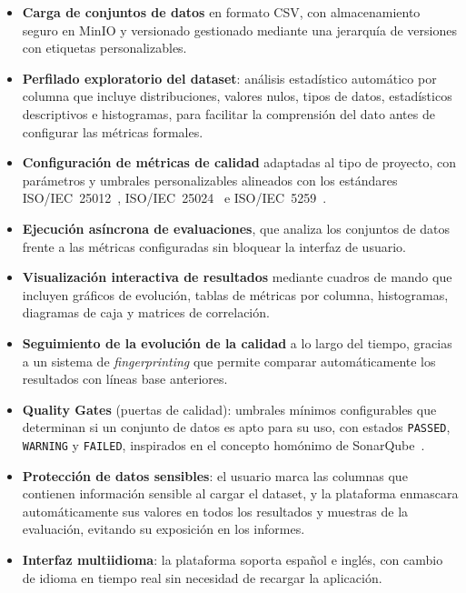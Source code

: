 \begin{itemize}
  \item \textbf{Carga de conjuntos de datos} en formato \ac{CSV}, con
    almacenamiento seguro en MinIO y versionado gestionado mediante
    una jerarquía de versiones con etiquetas personalizables.

  \item \textbf{Perfilado exploratorio del dataset}: análisis estadístico
    automático por columna que incluye distribuciones, valores nulos,
    tipos de datos, estadísticos descriptivos e histogramas, para facilitar
    la comprensión del dato antes de configurar las métricas formales.

  \item \textbf{Configuración de métricas de calidad} adaptadas al tipo de
    proyecto, con parámetros y umbrales personalizables alineados con los
    estándares \ac{ISO}/\ac{IEC}~25012~\citep{iso25012},
    \ac{ISO}/\ac{IEC}~25024~\citep{iso25024} e
    \ac{ISO}/\ac{IEC}~5259~\citep{iso5259}.

  \item \textbf{Ejecución asíncrona de evaluaciones}, que analiza los
    conjuntos de datos frente a las métricas configuradas sin bloquear la
    interfaz de usuario.

  \item \textbf{Visualización interactiva de resultados} mediante cuadros de
    mando que incluyen gráficos de evolución, tablas de métricas por columna,
    histogramas, diagramas de caja y matrices de correlación.

  \item \textbf{Seguimiento de la evolución de la calidad} a lo largo del
    tiempo, gracias a un sistema de \emph{fingerprinting} que permite comparar
    automáticamente los resultados con líneas base anteriores.

  \item \textbf{Quality Gates} (puertas de calidad): umbrales mínimos
    configurables que determinan si un conjunto de datos es apto para su uso,
    con estados \texttt{PASSED}, \texttt{WARNING} y \texttt{FAILED},
    inspirados en el concepto homónimo de SonarQube~\citep{sonarqube}.

  \item \textbf{Protección de datos sensibles}: el usuario marca las columnas
    que contienen información sensible al cargar el dataset, y la plataforma
    enmascara automáticamente sus valores en todos los resultados y muestras
    de la evaluación, evitando su exposición en los informes.

  \item \textbf{Interfaz multiidioma}: la plataforma soporta español e inglés,
    con cambio de idioma en tiempo real sin necesidad de recargar la
    aplicación.
\end{itemize}


